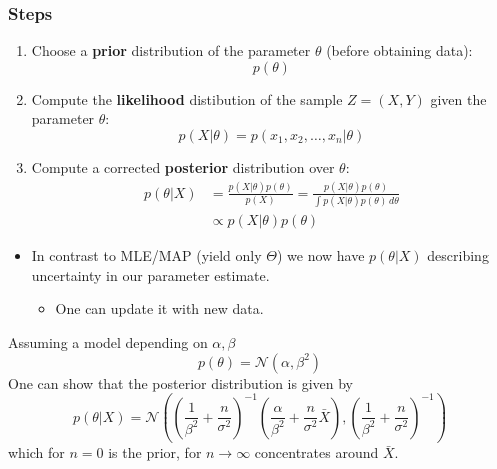 \subsubsection{Steps}
\begin{enumerate}
    \item Choose a \textbf{prior} distribution of the parameter $\theta$ (before obtaining data):
          \noindent\begin{equation*}
              p(\theta)
          \end{equation*}
    \item Compute the \textbf{likelihood} distibution of the sample $Z=(X,Y)$ given the parameter $\theta$:
          \noindent\begin{equation*}
              p(X|\theta) = p(x_1,x_2,\ldots,x_n|\theta)
          \end{equation*}
    \item Compute a corrected \textbf{posterior} distribution over $\theta$:
          \noindent\begin{align*}
              p(\theta|X) & =\frac{p(X|\theta)p(\theta)}{p(X)}      =\frac{p(X|\theta)p(\theta)}{\int p(X|\theta)p(\theta) \, d\theta} \\
                          & \propto p(X|\theta)p(\theta)
          \end{align*}
\end{enumerate}

\newpar{}
\begin{itemize}
    \item In contrast to MLE/MAP (yield only $\Theta$) we now have $p(\theta|X)$ describing uncertainty in our parameter estimate.
    \begin{itemize}
        \item One can update it with new data.
    \end{itemize}
\end{itemize}

\begin{examplesection}[Example]
    Assuming a model depending on $\alpha, \beta$
    \noindent\begin{equation*}
        p(\theta)    =  \mathcal{N}(\alpha,\beta^2)                                                                                                                                                                                      
    \end{equation*}
    One can show that the posterior distribution is given by
    \begin{equation*}
        p(\theta|X)  =\mathcal{N}\left({\left(\frac{1}{\beta^{2}}+\frac{n}{\sigma^{2}}\right)}^{-1}{\left(\frac{\alpha}{\beta^{2}}+\frac{n}{\sigma^{2}}\bar{X}\right),\left(\frac{1}{\beta^{2}}+\frac{n}{\sigma^{2}}\right)}^{-1}\right)
    \end{equation*}
    which for $n=0$ is the prior, for $n\rightarrow \infty$ concentrates around $\bar{X}$. 
\end{examplesection}

